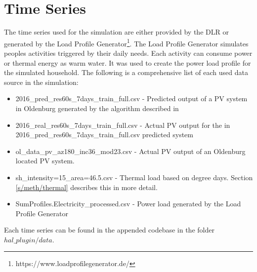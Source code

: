 \documentclass[a4paper,12pt]{book}
\theoremstyle{break}
\begin{document}
\section{Time Series}\label{s/meth/ts}
The time series used for the simulation are either provided by the \ac{DLR} or generated by the Load Profile Generator\footnote{https://www.loadprofilegenerator.de/}. The Load Profile Generator simulates peoples activities triggered by their daily needs. Each activity can consume power or thermal energy as warm water. It was used to create the power load profile for the simulated household.
The following is a comprehensive list of each used data source in the simulation: 

\begin{itemize}
	\item 2016\_pred\_res60s\_7days\_train\_full.csv - Predicted output of a \ac{PV} system in Oldenburg generated by the algorithm described in \cite{dlrPred}
	\item 2016\_real\_res60s\_7days\_train\_full.csv - Actual \ac{PV} output for the in 2016\_pred\_res60s\_7days\_train\_full.csv predicted system
	\item ol\_data\_pv\_az180\_inc36\_mod23.csv - Actual \ac{PV} output of an Oldenburg located \ac{PV} system.
	\item sh\_intensity=15\_area=46.5.csv - Thermal load based on degree days. Section \ref{s/meth/thermal} describes this in more detail.
	\item SumProfiles.Electricity\_processed.csv - Power load generated by the Load Profile Generator
\end{itemize}
Each time series can be found in the appended codebase in the folder $hal\_plugin/data$.
\end{document}
